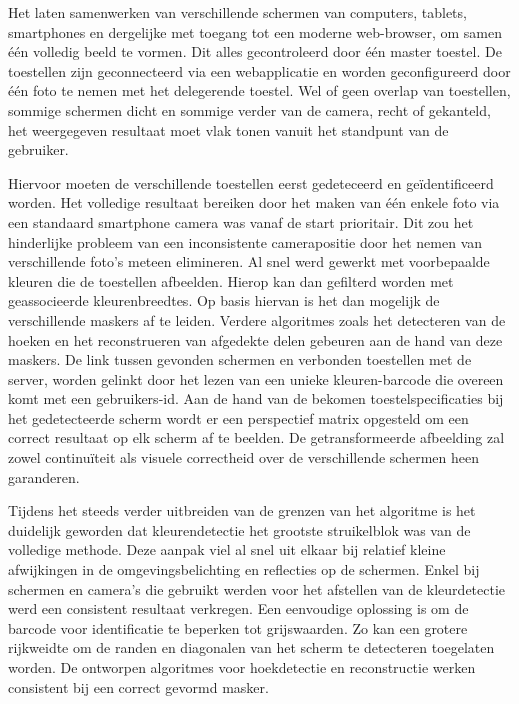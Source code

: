 Het laten samenwerken van verschillende schermen van computers, tablets, smartphones en dergelijke met toegang tot een moderne web-browser, om samen één volledig beeld te vormen. Dit alles gecontroleerd door één master toestel. De toestellen zijn geconnecteerd via een webapplicatie en worden geconfigureerd door één foto te nemen met het delegerende toestel. Wel of geen overlap van toestellen, sommige schermen dicht en sommige verder van de camera, recht of gekanteld, het weergegeven resultaat moet vlak tonen vanuit het standpunt van de gebruiker.

Hiervoor moeten de verschillende toestellen eerst gedeteceerd en geïdentificeerd worden. Het volledige resultaat bereiken door het maken van één enkele foto via een standaard smartphone camera was vanaf de start prioritair. Dit zou het hinderlijke probleem van een inconsistente camerapositie door het nemen van verschillende foto’s meteen elimineren. Al snel werd gewerkt met voorbepaalde kleuren die de toestellen afbeelden. Hierop kan dan gefilterd worden met geassocieerde kleurenbreedtes. Op basis hiervan is het dan mogelijk de verschillende maskers af te leiden. Verdere algoritmes zoals het detecteren van de hoeken en het reconstrueren van afgedekte delen gebeuren aan de hand van deze maskers. De link tussen gevonden schermen en verbonden toestellen met de server, worden gelinkt door het lezen van een unieke kleuren-barcode die overeen komt met een gebruikers-id. Aan de hand van de bekomen toestelspecificaties bij  het gedetecteerde scherm wordt er een perspectief matrix opgesteld om een correct resultaat op elk scherm af te beelden. De getransformeerde afbeelding zal zowel continuïteit als visuele correctheid over de verschillende schermen heen garanderen.

Tijdens het steeds verder uitbreiden van de grenzen van het algoritme is het duidelijk geworden dat kleurendetectie het grootste struikelblok was van de volledige methode. Deze aanpak viel al snel uit elkaar bij relatief kleine afwijkingen in de omgevingsbelichting en reflecties op de schermen. Enkel bij schermen en camera’s die gebruikt werden voor het afstellen van de kleurdetectie werd een consistent resultaat verkregen. Een eenvoudige oplossing is om de barcode voor identificatie te beperken tot grijswaarden. Zo kan een grotere rijkweidte om de randen en diagonalen van het scherm te detecteren toegelaten worden. De ontworpen algoritmes voor hoekdetectie en reconstructie werken consistent bij een correct gevormd masker.
